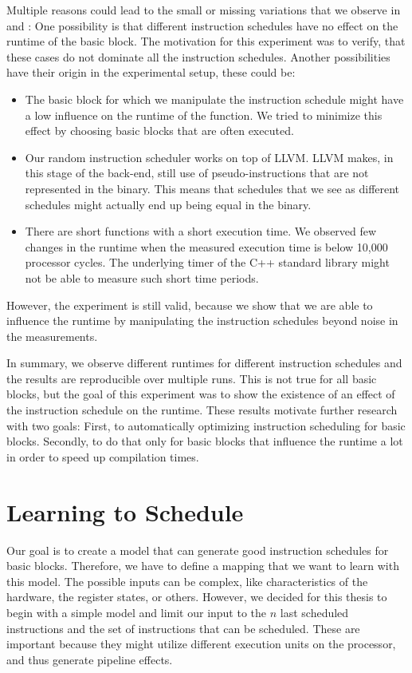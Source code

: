
Multiple reasons could lead to the small or missing variations that we observe in  and :
One possibility is that different instruction schedules have no effect on the runtime of the basic block.
The motivation for this experiment was to verify, that these cases do not dominate all the instruction schedules.
Another possibilities have their origin in the experimental setup, these could be:
\begin{itemize}
    \item The basic block for which we manipulate the instruction schedule might have a low influence on the runtime of the function.
        We tried to minimize this effect by choosing basic blocks that are often executed.
    \item Our random instruction scheduler works on top of LLVM.
        LLVM makes, in this stage of the back-end, still use of pseudo-instructions that are not represented in the binary.
        This means that schedules that we see as different schedules might actually end up being equal in the binary.
    \item There are short functions with a short execution time.
        We observed few changes in the runtime when the measured execution time is below 10,000 processor cycles.
        The underlying timer of the C++ standard library might not be able to measure such short time periods.  
\end{itemize}
However, the experiment is still valid, because we show that we are able to influence the runtime by manipulating the instruction schedules beyond noise in the measurements.

In summary, we observe different runtimes for different instruction schedules and the results are reproducible over multiple runs.
This is not true for all basic blocks, but the goal of this experiment was to show the existence of an effect of the instruction schedule on the runtime.
These results motivate further research with two goals:
First, to automatically optimizing instruction scheduling for basic blocks.
Secondly, to do that only for basic blocks that influence the runtime a lot in order to speed up compilation times.

\section{Learning to Schedule}
\label{sec:approach:ml}
Our goal is to create a model that can generate good instruction schedules for basic blocks.
Therefore, we have to define a mapping that we want to learn with this model.
The possible inputs can be complex, like characteristics of the hardware, the register states, or others.
However, we decided for this thesis to begin with a simple model and limit our input to the $n$ last scheduled instructions and the set of instructions that can be scheduled.
These are important because they might utilize different execution units on the processor, and thus generate pipeline effects.

